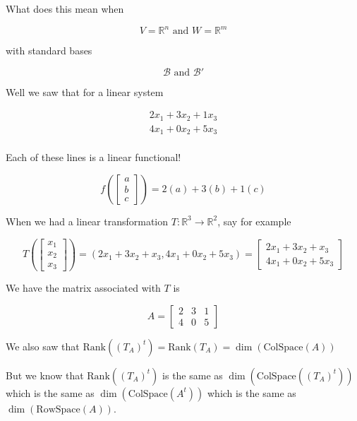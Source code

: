 \documentclass[12pt]{article}
\def\R{{\mathbb R}}
\newcommand{\rank}{\mathrm{Rank}}
\def\B{\mathcal B}
\def\RowSpace{\text{RowSpace}}
\def\ColSpace{\text{ColSpace}}
\begin{document}
  What does this mean when

  \[
    V = \R^n \text{ and } W = \R^m
  \]

  with standard bases

  \[
    \B \text{ and } \B'
  \]

  Well we saw that for a linear system

  \begin{align*}
    2x_1 + 3x_2 + 1x_3 \\
    4x_1 + 0x_2 + 5x_3 \\
  \end{align*}

  Each of these lines is a linear functional!

  \[
    f\left(\begin{bmatrix} a \\ b \\ c \end{bmatrix}\right) = 2(a) + 3(b) + 1(c)
  \]

  When we had a linear transformation $T: \R^3 \to \R^2$, say for example

  \[
    T\left(\begin{bmatrix} x_1 \\ x_2 \\ x_3 \end{bmatrix}\right) = (2x_1 + 3x_2
    + x_3, 4x_1 + 0x_2 + 5x_3) = \begin{bmatrix}
      2x_1 + 3x_2 + x_3 \\
      4x_1 + 0x_2 + 5x_3
    \end{bmatrix}
  \]

  We have the matrix associated with $T$ is

  \[
    A = \begin{bmatrix}
      2 & 3 & 1 \\
      4 & 0 & 5
    \end{bmatrix}
  \]

  We also saw that $\rank\left(\left(T_A\right)^t\right) = \rank(T_A) =
  \dim(\ColSpace(A))$

  But we know that $\rank\left(\left(T_A\right)^t\right)$ is the same as
  $\dim(\ColSpace((T_A)^t))$ which is the same as $\dim(\ColSpace(A^t))$ which
  is the same as $\dim(\RowSpace(A))$.
\end{document}

